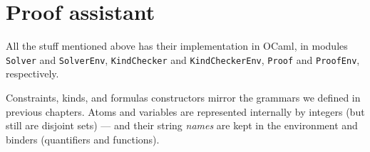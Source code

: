 \documentclass[english, mgr]{iithesis}
\begin{document}

\chapter{Proof assistant}
All the stuff mentioned above has their implementation in OCaml,
in modules \texttt{Solver} and \texttt{SolverEnv},
\texttt{KindChecker} and \texttt{KindCheckerEnv},
\texttt{Proof} and \texttt{ProofEnv}, respectively.

Constraints, kinds, and formulas constructors mirror the grammars we defined
in previous chapters.
Atoms and variables are represented internally by integers (but still are disjoint sets)
--- and their string \textit{names} are kept in the environment and binders
(quantifiers and functions).
\end{document}
